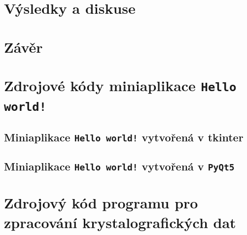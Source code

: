 \documentclass[a4paper, 12pt]{article}
\begin{document}
\newpage
\section{Výsledky a diskuse}

\newpage
\section{Závěr}


\newpage
{}




\newpage

\appendix
%
\section{Zdrojové kódy miniaplikace \texttt{Hello world!}}
\label{PrilohaA}
\subsection{Miniaplikace \texttt{Hello world!} vytvořená v tkinter}


\subsection{Miniaplikace \texttt{Hello world!} vytvořená v \texttt{PyQt5}}

%
\section{Zdrojový kód programu pro zpracování krystalografických dat}
\label{PrilohaB}

\end{document}
